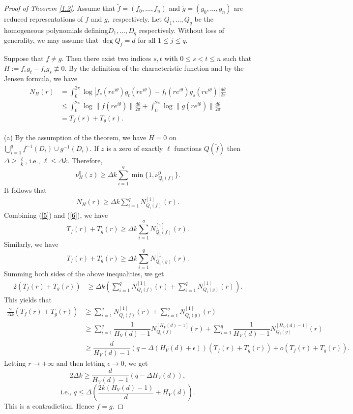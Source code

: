 \documentclass[12pt]{amsart}
\begin{document}
\begin{proof}[Proof of Theorem \ref{1.2}]
Assume that $\tilde f=(f_0,\ldots,f_n)$ and $\tilde g=(g_0,\ldots,g_n)$ are reduced representations of $f$ and $g,$ respectively. Let $Q_1,\ldots,Q_q$ be the homogeneous polynomials defining$D_1,\ldots,D_q$ respectively. Without loss of generality, we may assume that $\deg Q_j=d$ for all $1\le j\le q$.

Suppose that $f\ne g$. Then there exist two indices $s,t$ with $0\le s<t\le n$ such that $ H:=f_sg_t-f_tg_s\not\equiv 0.$
By the definition of the characteristic function and by the Jensen formula, we have
\begin{align}\label{5}
\begin{split}
N_H(r)&=\int_{0}^{2\pi}\log |f_s(re^{i\theta})g_t(re^{i\theta})-f_t(re^{i\theta})g_s(re^{i\theta})|\frac{d\theta}{2\pi}\\ 
& \le \int_{0}^{2\pi}\log \|f(re^{i\theta})\|\frac{d\theta}{2\pi} + \int_{0}^{2\pi}\log \|g(re^{i\theta})\|\frac{d\theta}{2\pi} \\
&=T_f(r)+T_g(r).
\end{split}
\end{align}

(a) By the assumption of the theorem, we have $H=0$ on $\bigcup_{i=1}^qf^{-1}(D_i)\cup g^{-1}(D_i)$. 
If $z$ is a zero of exactly $\ell$ functions $Q(\tilde f)$ then $\Delta\ge\frac{\ell}{k}$, i.e., $\ell\le\Delta k.$
Therefore, 
$$\nu^0_H(z)\ge \Delta k\sum_{i=1}^q\min\{1,\nu^0_{Q_i(f)}\}.$$
It follows that
\begin{align}\label{6}
N_H(r)\ge \Delta k\sum_{i=1}^qN^{[1]}_{Q_i(f)}(r).
\end{align}
Combining (\ref{5}) and (\ref{6}), we have
$$ T_f(r)+T_g(r) \ge \Delta k\sum_{i=1}^qN^{[1]}_{Q_i(f)}(r).$$
Similarly, we have
$$ T_f(r)+T_g(r) \ge \Delta k\sum_{i=1}^qN^{[1]}_{Q_i(g)}(r).$$
Summing both sides of the above inequalities, we get
\begin{align*}
 2(T_f(r)+T_g(r))& \ge \Delta k\left(\sum_{i=1}^qN^{[1]}_{Q_i(f)}(r)+\sum_{i=1}^qN^{[1]}_{Q_i(g)}(r)\right).
\end{align*}
This yields that
\begin{align*}
\frac{2}{\Delta k}(T_f(r)+T_g(r))&\ge\sum_{i=1}^qN^{[1]}_{Q_i(f)}(r)+\sum_{i=1}^qN^{[1]}_{Q_i(g)}(r)\\
&\ge \sum_{i=1}^q\dfrac{1}{H_V(d)-1}N^{[H_V(d)-1]}_{Q_i(f)}(r)+\sum_{i=1}^q\dfrac{1}{H_V(d)-1}N^{[H_V(d)-1]}_{Q_i(g)}(r)\\
&\ge \dfrac{d}{H_V(d)-1}(q-\Delta (H_V(d)+\epsilon))(T_f(r)+T_g(r))+o(T_f(r)+T_g(r)).
\end{align*}
Letting $r\longrightarrow +\infty$ and then letting $\epsilon\longrightarrow 0$, we get 
$$2\Delta k\ge \dfrac{d}{H_V(d)-1}(q-\Delta H_V(d)),$$
$$\text{i.e., } q\le \Delta\left(\frac{2k(H_V(d)-1)}{d}+ H_V(d)\right).$$
This is a contradiction.
Hence $f=g$.


\end{proof}
\end{document}
